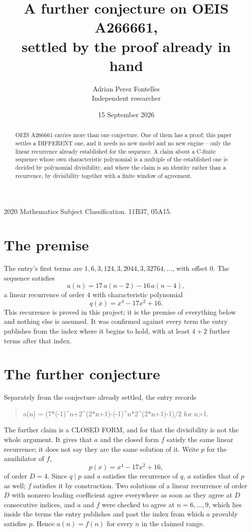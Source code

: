 \documentclass[11pt,a4paper]{article}
\title{A further conjecture on OEIS A266661,\\ \large settled by the proof already in hand}
\author{Adrian Perez Fontelles\\ \small Independent researcher}
\date{15 September 2026}
\theoremstyle{plain}
\theoremstyle{definition}
\begin{document}
\maketitle

\begin{abstract}
OEIS A266661 carries more than one conjecture. One of them has a proof; this paper settles a
DIFFERENT one, and it needs no new model and no new engine -- only the linear recurrence already
established for the sequence. A claim about a C-finite sequence whose own characteristic
polynomial is a multiple of the established one is decided by polynomial divisibility, and where
the claim is an identity rather than a recurrence, by divisibility together with a finite window
of agreement.
\end{abstract}

\noindent\small 2020 Mathematics Subject Classification. 11B37, 05A15.\normalsize

\section{The premise}

The entry's first terms are $1, 6, 3, 124, 3, 2044, 3, 32764,\dots$, with offset $0$. The sequence satisfies
\[
  a(n)=17\,a(n-2) - 16\,a(n-4) ,
\]
a linear recurrence of order $4$ with characteristic polynomial
\[
  q(x)=x^{4} - 17 x^{2} + 16 .
\]
This recurrence is proved in this project; it is the premise of everything below and nothing else is assumed.
It was confirmed against every term the entry publishes from the index where it begins to hold,
with at least $4+2$ further terms after that index.

\section{The further conjecture}

Separately from the conjecture already settled, the entry records

\begin{quote}\raggedright a(n) = (7*(-1)\^{}n+2\^{}(2*n+1)-(-1)\^{}n*2\^{}(2*n+1)-1)/2 for n>1.\end{quote}

The further claim is a CLOSED FORM, and for that the divisibility is not the whole argument. It
gives that $a$ and the closed form $f$ satisfy the same linear recurrence; it does not say they
are the same solution of it. Write $p$ for the annihilator of $f$,
\[
  p(x)=x^{4} - 17 x^{2} + 16 ,
\]
of order $D=4$. Since $q\mid p$ and $a$ satisfies the recurrence of $q$, $a$ satisfies that of
$p$ as well; $f$ satisfies it by construction. Two solutions of a linear recurrence of order $D$
with nonzero leading coefficient agree everywhere as soon as they agree at $D$ consecutive
indices, and $a$ and $f$ were checked to agree at $n=6,\dots,9$,
which lies inside the terms the entry publishes and past the index from which $a$ provably
satisfies $p$. Hence $a(n)=f(n)$ for every $n$ in the claimed range.
\end{document}
